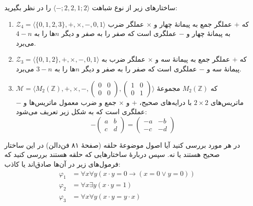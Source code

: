 ساختارهای زیر از نوع شباهت
$\langle\mathord{-};2,2,1;2\rangle$
را در نظر بگیرید:
\begin{enumerate}[label=(\alph*)]
    \item $\mathcal{Z}_4=\langle\{0,1,2,3\},+,\times,-, 0,1\rangle$
    که $+$ عملگر جمع به پیمانهٔ چهار و
    $\times$
    عملگر ضرب به پیمانهٔ چهار و
    $-$
    عملگری است که صفر را به صفر و دیگر $n$ها را به $4-n$ می‌برد.
    \item $\mathcal{Z}_3=\langle\{0,1,2\},+,\times,-, 0,1\rangle$
    که $+$ عملگر جمع به پیمانهٔ سه و
    $\times$
    عملگر ضرب به پیمانهٔ سه و
    $-$
    عملگری است که صفر را به صفر و دیگر $n$ها را به $3-n$ می‌برد.
    \item $\mathcal{M}=\langle M_2(\mathbb{Z}),+,\times,-,
    \begin{pmatrix}
        0 & 0 \\ 0 & 0
    \end{pmatrix},
    \begin{pmatrix}
        1 & 0 \\ 0 & 1
    \end{pmatrix}
    \rangle$
    که
    $M_2(\mathbb{Z})$
    مجموعهٔ ماتریس‌های
    $2\times 2$
    با درایه‌های صحیح،
    $+$
    و
    $\times$
    جمع و ضرب معمول ماتریس‌ها و
    $-$
    عملگری است که به شکل زیر تعریف می‌شود:
    $$-\begin{pmatrix}
        a & b \\ c & d
    \end{pmatrix}
    =\begin{pmatrix}
        -a & -b \\ -c & -d
    \end{pmatrix}$$
\end{enumerate}
در هر مورد بررسی کنید آیا اصول موضوعهٔ حلقه
(صفحهٔ ۸۱ فن‌دالن)
در این ساختار صحیح هستند یا نه. سپس دربارهٔ ساختارهایی که حلقه هستند بررسی کنید که فرمول‌های زیر در آن‌ها صادق‌اند یا کاذب:
\begin{align*}
    \varphi_1 &= \forall x \forall y (x\cdot y=0\to (x=0\vee y=0)) \\
    \varphi_2 &= \forall x \exists y (x\cdot y=1)\\
    \varphi_3 &= \forall x \forall y (x\cdot y = y\cdot x)
\end{align*}